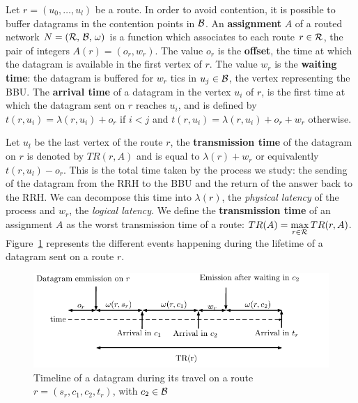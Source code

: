 \documentclass[a4paper,10pt]{article}
\begin{document}
        Let $r=(u_0,\dots,u_l)$ be a route. In order to avoid contention, it is possible to buffer datagrams in the contention points in $\cal{B}$. An \textbf{assignment} $A$ of a routed network $N = (\cal{R},\,\cal{B},\,\omega)$ is a function which associates to each route $r \in \cal{R}$, the pair of integers $A(r) = (o_r,w_r)$.
        The value $o_r$ is the \textbf{offset}, the time at which the datagram is available in the first vertex of $r$. The value $w_r$ is the \textbf{waiting time}: the datagram is buffered 
        for $w_r$ tics in $u_j \in \cal{B}$, the vertex representing the BBU.
 		The \textbf{arrival time} of a datagram in the vertex $u_i$ of $r$, is the first time at which the datagram sent on $r$ reaches $u_i$, and is defined by $t(r,u_i) = \lambda(r,u_i) + o_r $ if 
 		$i < j$ and $t(r,u_i) = \lambda(r,u_i) + o_r + w_r$ otherwise.

 		 Let $u_l$ be the last vertex of the route $r$, the \textbf{transmission time} of the datagram on 
  		$r$ is denoted by $TR(r,A)$ and is equal to $\lambda(r) + w_r$ or equivalently $t(r,u_l) - o_r$. This is the total time taken by the process we study: the sending of the datagram from the RRH to the BBU and the return of the answer back to the RRH. We can decompose this time into $\lambda(r)$, the \emph{physical latency} of the process and $w_r$, the \emph{logical latency}. 
  		We define the \textbf{transmission time} of an assignment $A$ as the worst transmission time of a route: $TR(A) = \displaystyle \max\limits_{r \in {\cal R}} TR(r,A)$. 
        Figure~\ref{fig:datagramtimeline} represents the different events happening during the lifetime  of a datagram  sent on a route $r$.
  		\begin{figure}
  		 \begin{center}
      \includegraphics[width=\textwidth]{time.pdf}
      \end{center}
      \caption{Timeline of a datagram during its travel on a route $r = (s_r,c_1,c_2,t_r)$, with $c_2 \in \cal{B}$}
      \label{fig:datagramtimeline}
  		\end{figure}
\end{document}
